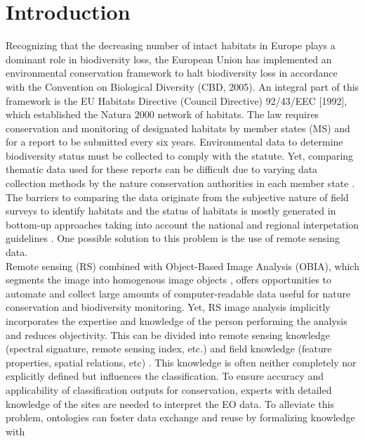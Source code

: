 \documentclass[authoryear, review,12pt,number]{elsarticle}
\begin{document}
\section{Introduction}  %
Recognizing that the decreasing number of
intact habitats in Europe  plays a dominant role in biodiversity loss, the
European Union has implemented an environmental conservation framework to halt
biodiversity loss in accordance with the Convention on Biological Diversity
(CBD, 2005). An integral part of this framework is the EU Habitats Directive
(Council Directive) 92/43/EEC [1992], which established the Natura 2000 network
of habitats. The law requires conservation and monitoring of designated habitats
by member states (MS) and for a report to be submitted every six years.
Environmental data to determine biodiversity status must be collected to comply
with the statute. Yet, comparing thematic data used for these reports can be
difficult due to varying data collection methods by the nature conservation
authorities in each member state \citep{INSPIREdataspecs, INSPIRE}. The barriers
to comparing the data originate from the subjective nature of field surveys to
identify habitats \citep{Cherrill1999, Cherrill1999a, Nieland2015, Nieland2016}
and the status of habitats is mostly generated in bottom-up approaches taking
into account the national and regional interpetation guidelines
\citep{INSPIREdataspecs}. One possible solution to this problem is the use of
remote sensing data. 
\\
Remote sensing (RS) combined with Object-Based Image
Analysis (OBIA), which segments the image into homogenous image objects
\citep{Blaschke2010}, offers opportunities to automate and collect large amounts
of computer-readable data useful for nature conservation \citep{Corbane2015,
VandenBorre2011, Mayer2011} and biodiversity monitoring. Yet, RS image analysis
implicitly incorporates the expertise and knowledge of the person performing the
analysis and reduces objectivity. This can be divided into remote sensing
knowledge (spectral signature, remote sensing index, etc.) and field
knowledge (feature properties, spatial relations, etc) \citep{Andres2013a}.
This knowledge is often neither completely nor explicitly defined but
influences the classification. To ensure accuracy and applicability of
classification outputs for conservation, experts with detailed knowledge of
the sites are needed to interpret the EO data. To alleviate this problem,
ontologies can foster data exchange and reuse by formalizing knowledge with
\end{document}

